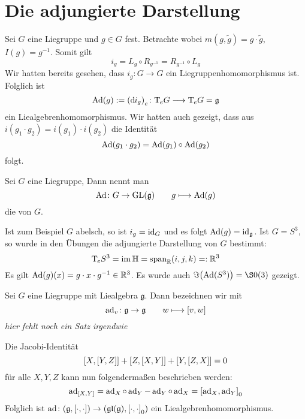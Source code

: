 \section{Die adjungierte Darstellung} %
\label{sec:15}
Sei $G$ eine Liegruppe und $g \in G$ fest. Betrachte
wobei $m(g,\tilde{g})= g \cdot \tilde{g}$, $I(g)=g^{-1}$. 
Somit gilt
\[
	i_g = L_g \circ R_{g^{-1}} = R_{g^{-1}} \circ L_g
\]
Wir hatten bereits gesehen, dass $i_g \colon G \to G$ ein Liegruppenhomomorphismus ist.
Folglich ist 
\[
	\Ad(g) := \enbrace*{\mathd i_g}_e \colon \Tmap_e G \longrightarrow \Tmap_eG = \mathfrak{g}
\]
ein Liealgebrenhomomorphismus.
Wir hatten auch gezeigt, dass aus $i(g_1 \cdot g_2) = i(g_1) \cdot i(g_2)$ die Identität 
\[
	\Ad(g_1 \cdot g_2) = \Ad(g_1) \circ \Ad(g_2)
\]
folgt.

\begin{definition}[{name=[adjungierte Darstellung]}]
	Sei $G$ eine Liegruppe,
	Dann nennt man 
	\[
		\Ad \colon G \to \GL(\mathfrak{g}) \qquad g \longmapsto \Ad(g)
	\]
	die  von $G$.
\end{definition}

Ist zum Beispiel $G$ abelsch, so ist $i_g = \id_G$ und es folgt ${\Ad(g)} = \id_{\mathfrak{g}}$.
Ist $G=S^3$, so wurde in den Übungen die adjungierte Darstellung von $G$ bestimmt:
\[
	\Tmap_e S^3 = \im \mathbb{H} = \Span_\mathbb{R} (i,j,k) =: \mathbb{R}^3
\]
Es gilt $\Ad(g)(x) = g \cdot x \cdot g^{-1} \in \mathbb{R}^3$.
Es wurde auch $\Im \enbrace*{\Ad(S^3)} = \S0(3)$ gezeigt.

\begin{definition}
	Sei $G$ eine Liegruppe mit Liealgebra $\mathfrak{g}$.
	Dann bezeichnen wir mit 
	\[
		\ad_v \colon \mathfrak{g} \to \mathfrak{g} \qquad w \longmapsto \benbrace*{v,w}
	\]
	\emph{hier fehlt noch ein Satz irgendwie}
\end{definition}

Die Jacobi-Identität 
\[
	\benbrace*{X,\benbrace*{Y,Z}} + \benbrace*{Z, \benbrace*{X,Y}} + \benbrace*{Y, \benbrace*{Z,X}} =0
\]
für alle $X,Y,Z$ kann nun folgendermaßen beschrieben werden:
\[
	\ad_{\benbrace*{X,Y}} = \ad_X \circ \ad_Y - \ad_Y \circ \ad_X = \benbrace*{\ad_X, \ad_Y}_0
\]
Folglich ist $\ad \colon \enbrace*{\mathfrak{g}, \benbrace*{\cdot ,\cdot }} \to \enbrace*{\mathfrak{gl}(\mathfrak{g}), \benbrace*{\cdot ,\cdot }_0}$
ein Liealgebrenhomomorphismus.

